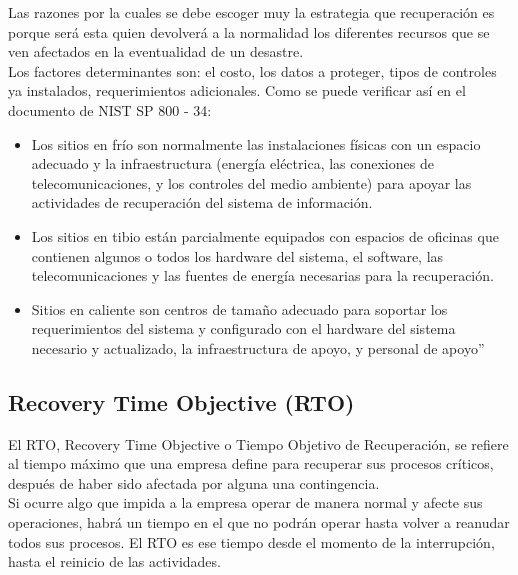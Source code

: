 \documentclass[conference]{IEEEtran}
\begin{document}
Las razones por la cuales se debe escoger muy la estrategia que
recuperación es porque será esta quien devolverá a la normalidad los
diferentes recursos que se ven afectados en la eventualidad de un
desastre.
\\
Los factores determinantes son: el costo, los datos a proteger, tipos de
controles ya instalados, requerimientos adicionales.
Como se puede verificar así en el documento de NIST SP 800 - 34:
\begin{itemize}
    \item Los sitios en frío son normalmente las instalaciones físicas con un
espacio adecuado y la infraestructura (energía eléctrica, las
conexiones de telecomunicaciones, y los controles del medio
ambiente) para apoyar las actividades de recuperación del sistema de
información.
\item Los sitios en tibio están parcialmente equipados con espacios de
oficinas que contienen algunos o todos los hardware del sistema, el
software, las telecomunicaciones y las fuentes de energía necesarias
para la recuperación.
\item Sitios en caliente son centros de tamaño adecuado para soportar los
requerimientos del sistema y configurado con el hardware del sistema
necesario y actualizado, la infraestructura de apoyo, y personal de
apoyo”
\end{itemize}

\subsection{Recovery Time Objective (RTO)}
El RTO, Recovery Time Objective o Tiempo Objetivo de Recuperación, se refiere al tiempo máximo que una empresa define para recuperar sus procesos críticos, después de haber sido afectada por alguna una contingencia.
\\
Si ocurre algo que impida a la empresa operar de manera normal y afecte sus operaciones, habrá un tiempo en el que no podrán operar hasta volver a reanudar todos sus procesos. El RTO es ese tiempo desde el momento de la interrupción, hasta el reinicio de las actividades.
\end{document}
